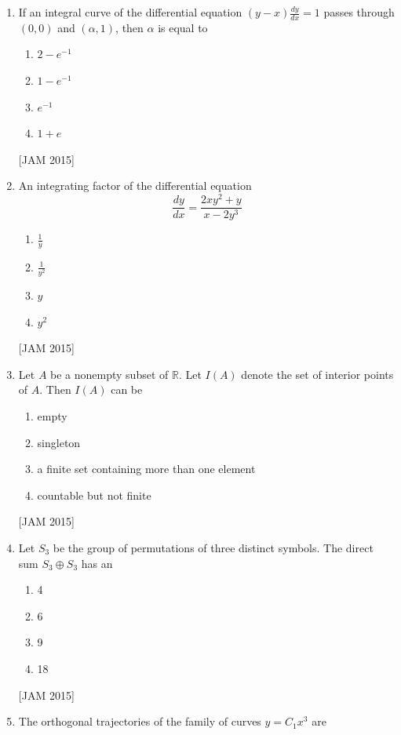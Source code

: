 \begin{enumerate}
\item  If an integral curve of the differential equation $(y-x) \frac{d y}{d x}=1$ passes through $(0,0)$ and $(\alpha, 1)$, then $\alpha$ is equal to 
\begin{enumerate}
    \item $2-e^{-1}$ 
\item $1-e^{-1}$ 
\item $e^{-1}$ 
\item $1+e$
\end{enumerate}
\hfill [JAM 2015]





\item  An integrating factor of the differential equation
$$
\frac{d y}{d x}=\frac{2 x y^{2}+y}{x-2 y^{3}}
$$
\begin{enumerate}
    
\item $\frac{1}{y}$ 
\item $\frac{1}{y^{2}}$ 
\item $y$ 
\item $y^{2}$
\end{enumerate}
\hfill [JAM 2015]




\item  Let $A$ be a nonempty subset of $\mathbb{R}$. Let $I(A)$ denote the set of interior points of $A$. Then $I(A)$ can be 
\begin{enumerate}
   \item empty 
\item singleton 
\item a finite set containing more than one element 
\item countable but not finite 
\end{enumerate}
\hfill [JAM 2015]



 \item  Let $S_{3}$ be the group of permutations of three distinct symbols. The direct sum $S_{3} \oplus S_{3}$ has an 
\begin{enumerate}
    \item 4 
\item 6 
\item 9 
\item 18
\end{enumerate}
\hfill [JAM 2015]





\item  The orthogonal trajectories of the family of curves $y=C_{1} x^{3}$ are 
\begin{enumerate}
    

\end{enumerate}
\end{enumerate}
